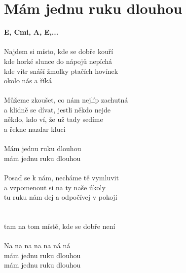 \section{Mám jednu ruku dlouhou}
\footnotesize\textbf{E, C\kr mi, A, E,...}\\
\normalsize
\\
Najdem si místo, kde se dobře kouří\\
kde horké slunce do nápojů nepíchá\\
kde vítr snáší žmolky ptačích hovínek\\
okolo nás a říká\\
\\
Můžeme zkoušet, co nám nejlíp zachutná\\
a klidně se dívat, jestli někdo nejde\\
někdo, kdo ví, že už tady sedíme\\
a řekne nazdar kluci\\
\\
Mám jednu ruku dlouhou\\
mám jednu ruku dlouhou\\
\\
Posaď se k nám, necháme tě vymluvit\\
a vzpomenout si na ty naše úkoly\\
tu ruku nám dej a odpočívej v pokoji\\
\\
\\
tam na tom místě, kde se dobře není\\
\\
Na na na na na ná ná\\
mám jednu ruku dlouhou\\
mám jednu ruku dlouhou\\
